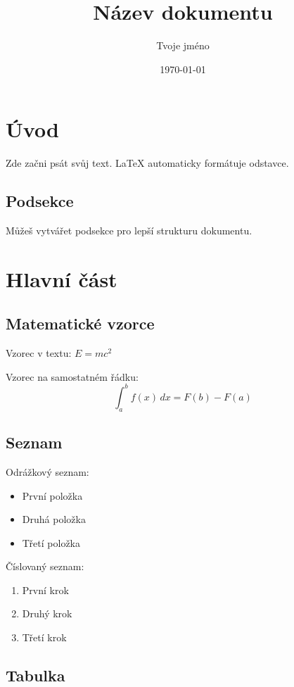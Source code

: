 \documentclass[12pt,a4paper]{article}
\title{Název dokumentu}
\author{Tvoje jméno}
\date{\today}
\begin{document}
\maketitle

\tableofcontents
\newpage

\section{Úvod}

Zde začni psát svůj text. LaTeX automaticky formátuje odstavce.

\subsection{Podsekce}

Můžeš vytvářet podsekce pro lepší strukturu dokumentu.

\section{Hlavní část}

\subsection{Matematické vzorce}

Vzorec v textu: $E = mc^2$

Vzorec na samostatném řádku:
\[
\int_{a}^{b} f(x) \, dx = F(b) - F(a)
\]

\subsection{Seznam}

Odrážkový seznam:
\begin{itemize}
    \item První položka
    \item Druhá položka
    \item Třetí položka
\end{itemize}

Číslovaný seznam:
\begin{enumerate}
    \item První krok
    \item Druhý krok
    \item Třetí krok
\end{enumerate}

\subsection{Tabulka}
\end{document}
